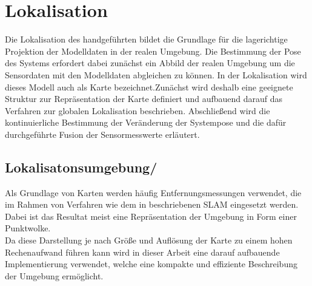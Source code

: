 \chapter{Lokalisation}
\label{chap.loc}

Die Lokalisation des handgeführten  bildet die Grundlage für die lagerichtige Projektion der Modelldaten in der realen Umgebung. Die Bestimmung der Pose des Systems erfordert dabei zunächst ein Abbild der realen Umgebung um die Sensordaten mit den Modelldaten abgleichen zu können. In der Lokalisation wird dieses Modell auch als Karte bezeichnet. Zunächst wird deshalb eine geeignete Struktur zur Repräsentation der Karte definiert und aufbauend darauf das Verfahren zur globalen Lokalisation beschrieben. Abschließend wird die kontinuierliche Bestimmung der Veränderung der Systempose und die dafür durchgeführte Fusion der Sensormesswerte erläutert.

\section{Lokalisatonsumgebung/\red[Karte]}
\label{chap.map}
Als Grundlage von Karten werden häufig Entfernungsmessungen verwendet, die im Rahmen von Verfahren wie dem in  beschriebenen SLAM eingesetzt werden. Dabei ist das Resultat meist eine Repräsentation der Umgebung in Form einer Punktwolke.\\
Da diese Darstellung je nach Größe und Auflösung der Karte zu einem hohen Rechenaufwand führen kann wird in dieser Arbeit eine darauf aufbauende Implementierung \cite{Octomap} verwendet, welche eine kompakte und effiziente Beschreibung der Umgebung ermöglicht.\\

